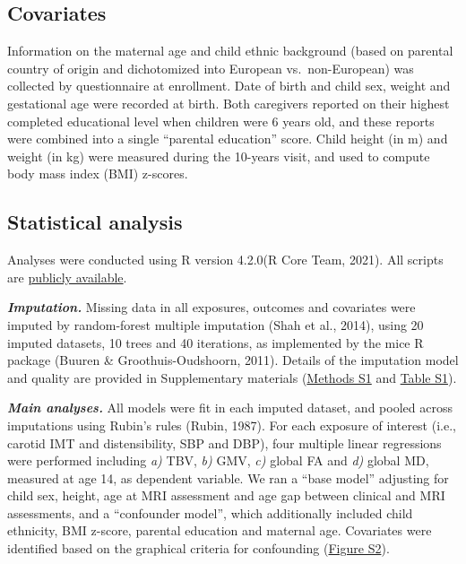 \documentclass[
  letterpaper,
  DIV=11,
  numbers=noendperiod]{scrreport}
\begin{document}
\subsection{Covariates}\label{covariates-1}

Information on the maternal age and child ethnic background (based on
parental country of origin and dichotomized into European
vs.~non-European) was collected by questionnaire at enrollment. Date of
birth and child sex, weight and gestational age were recorded at birth.
Both caregivers reported on their highest completed educational level
when children were 6 years old, and these reports were combined into a
single ``parental education'' score. Child height (in m) and weight (in
kg) were measured during the 10-years visit, and used to compute body
mass index (BMI) z-scores.

\subsection{Statistical analysis}\label{statistical-analysis-2}

Analyses were conducted using R version 4.2.0(R Core Team, 2021). All
scripts are
\href{https://github.com/SereDef/arterial-health-brain}{publicly
available}.

\textbf{\emph{Imputation.}} Missing data in all exposures, outcomes and
covariates were imputed by random-forest multiple imputation (Shah et
al., 2014), using 20 imputed datasets, 10 trees and 40 iterations, as
implemented by the mice R package (Buuren \& Groothuis-Oudshoorn, 2011).
Details of the imputation model and quality are provided in
Supplementary materials (\href{https://osf.io/2f4sg}{Methods S1} and
\href{https://osf.io/2f4sg}{Table S1}).

\textbf{\emph{Main analyses.}} All models were fit in each imputed
dataset, and pooled across imputations using Rubin's rules (Rubin,
1987). For each exposure of interest (i.e., carotid IMT and
distensibility, SBP and DBP), four multiple linear regressions were
performed including \emph{a)} TBV, \emph{b)} GMV, \emph{c)} global FA
and \emph{d)} global MD, measured at age 14, as dependent variable. We
ran a ``base model'' adjusting for child sex, height, age at MRI
assessment and age gap between clinical and MRI assessments, and a
``confounder model'', which additionally included child ethnicity, BMI
z-score, parental education and maternal age. Covariates were identified
based on the graphical criteria for confounding
(\href{https://osf.io/2f4sg}{Figure S2}).
\end{document}
